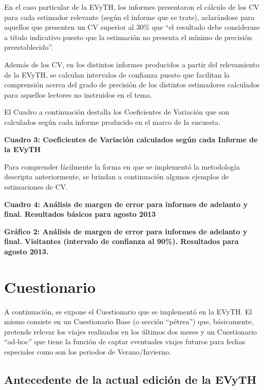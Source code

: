 \documentclass[
  openany]{book}
\begin{document}
En el caso particular de la EVyTH, los informes presentaron el cálculo de los CV para cada estimador relevante (según el informe que se trate), aclarándose para aquellos que presenten un CV superior al 30\% que ``el resultado debe considerase a título indicativo puesto que la estimación no presenta el mínimo de precisión preestablecido''.

Además de los CV, en los distintos informes producidos a partir del relevamiento de la EVyTH, se calculan intervalos de confianza puesto que facilitan la comprensión acerca del grado de precisión de los distintos estimadores calculados para aquellos lectores no instruidos en el tema.

El Cuadro a continuación destalla los Coeficientes de Variación que son calculados según cada informe producido en el marco de la encuesta.

\textbf{Cuadro 3: Coeficientes de Variación calculados según cada Informe de la EVyTH}

Para comprender fácilmente la forma en que se implementó la metodología descripta anteriormente, se brindan a continuación algunos ejemplos de estimaciones de CV.

\textbf{Cuadro 4: Análisis de margen de error para informes de adelanto y final. Resultados básicos para agosto 2013}

\textbf{Gráfico 2: Análisis de margen de error para informes de adelanto y final. Visitantes (intervalo de confianza al 90\%). Resultados para agosto 2013.}

\hypertarget{cuestionario}{%
\chapter{\texorpdfstring{\textbf{Cuestionario}}{Cuestionario}}\label{cuestionario}}

A continuación, se expone el Cuestionario que se implementó en la EVyTH.
El mismo consiste en un Cuestionario Base (o sección ``pétrea'') que, básicamente, pretende relevar los viajes realizados en los últimos dos meses y un Cuestionario ``ad-hoc'' que tiene la función de captar eventuales viajes futuros para fechas especiales como son los periodos de Verano/Invierno.

\hypertarget{antecedente-de-la-actual-ediciuxf3n-de-la-evyth}{%
\section{Antecedente de la actual edición de la EVyTH}\label{antecedente-de-la-actual-ediciuxf3n-de-la-evyth}}
\end{document}

